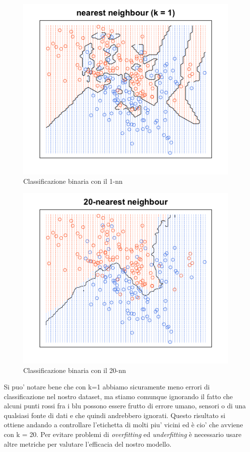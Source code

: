 \begin{figure}[H]
	\centering
	\includegraphics[width=0.7\linewidth]{img/1nearestneigh}
	\caption{Classificazione binaria con il 1-nn}
	\label{fig:1nearestneigh}
\end{figure}

\begin{figure}[H]
	\centering
	\includegraphics[width=0.7\linewidth]{img/20nearestneigh}
	\caption{Classificazione binaria con il 20-nn}
	\label{fig:20nearestneigh}
\end{figure}

Si puo' notare bene che con k=1 abbiamo sicuramente meno errori di classificazione nel nostro dataset, ma stiamo comunque ignorando il fatto che alcuni punti rossi fra i blu possono essere frutto di errore umano, sensori o di una qualsiasi fonte di dati e che quindi andrebbero ignorati. Questo risultato si ottiene andando a controllare l'etichetta di molti piu' vicini ed \`e cio' che avviene con k = 20.
Per evitare problemi di \textit{overfitting} ed \textit{underfitting} \`e necessario usare altre metriche per valutare l'efficacia del nostro modello.

